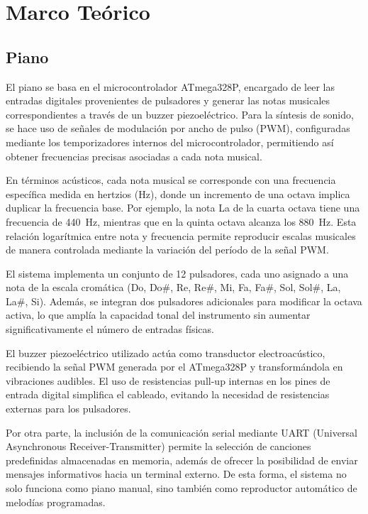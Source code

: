 \section{Marco Teórico}

\subsection{Piano}

El piano se basa en el microcontrolador ATmega328P, encargado de leer las entradas digitales provenientes de pulsadores y generar las notas musicales correspondientes a través de un buzzer piezoeléctrico. 
Para la síntesis de sonido, se hace uso de señales de modulación por ancho de pulso (PWM), configuradas mediante los temporizadores internos del microcontrolador, permitiendo así obtener frecuencias precisas asociadas a cada nota musical.

En términos acústicos, cada nota musical se corresponde con una frecuencia específica medida en hertzios (Hz), donde un incremento de una octava implica duplicar la frecuencia base. 
Por ejemplo, la nota La de la cuarta octava tiene una frecuencia de 440~Hz, mientras que en la quinta octava alcanza los 880~Hz. 
Esta relación logarítmica entre nota y frecuencia permite reproducir escalas musicales de manera controlada mediante la variación del período de la señal PWM.

El sistema implementa un conjunto de 12 pulsadores, cada uno asignado a una nota de la escala cromática (Do, Do\#, Re, Re\#, Mi, Fa, Fa\#, Sol, Sol\#, La, La\#, Si). 
Además, se integran dos pulsadores adicionales para modificar la octava activa, lo que amplía la capacidad tonal del instrumento sin aumentar significativamente el número de entradas físicas.

El buzzer piezoeléctrico utilizado actúa como transductor electroacústico, recibiendo la señal PWM generada por el ATmega328P y transformándola en vibraciones audibles. 
El uso de resistencias pull-up internas en los pines de entrada digital simplifica el cableado, evitando la necesidad de resistencias externas para los pulsadores.

Por otra parte, la inclusión de la comunicación serial mediante UART (Universal Asynchronous Receiver-Transmitter) permite la selección de canciones predefinidas almacenadas en memoria, 
además de ofrecer la posibilidad de enviar mensajes informativos hacia un terminal externo. 
De esta forma, el sistema no solo funciona como piano manual, sino también como reproductor automático de melodías programadas.

